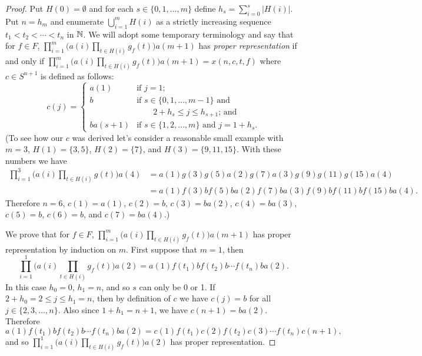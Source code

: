 \begin{proof}
  Put $H(0) = \emptyset$ and for each $s \in \{0, 1, \ldots, m\}$ define $h_s = \sum_{i=0}^s |H(i)|$.
  Put $n = h_m$ and enumerate $\bigcup_{i=1}^m H(i)$ as a strictly increasing sequence $t_1 < t_2 < \cdots < t_n$ in $\mathbb{N}$. 
  We will adopt some temporary terminology and say that for $f \in F$, $\prod_{i=1}^m \bigl( a(i) \prod_{t \in H(i)} g_f(t) \bigr) a(m+1)$ has \emph{proper representation} if and only if $\prod_{i=1}^m \bigl( a(i) \prod_{t \in H(i)} g_f(t) \bigr) a(m+1) = x(n, c, t, f)$ where $c \in S^{n+1}$ is defined as follows:
  \[
    c(j) = 
    \begin{cases}
      a(1) & \mbox{if $j = 1$;} \\
      b & \mbox{if $s \in \{0, 1, \ldots, m-1\}$ and} \\
      &   \hspace{2em}\mbox{$2+h_s \le j \le h_{s+1}$; and} \\
      ba(s+1) & \mbox{if $s \in \{1, 2, \ldots, m\}$ and $j = 1+h_s$.}
    \end{cases}
  \]
  {
    (To see how our $c$ was derived let's consider a reasonable small example with $m = 3$, $H(1) = \{3, 5\}$, $H(2) = \{7\}$, and $H(3) = \{9, 11, 15\}$.
    With these numbers we have
    \begin{align*}
      \textstyle
      \prod_{i=1}^3 \bigl( a(i) \prod_{t \in H(i)} g(t) \bigr) a(4) &=
      a(1) g(3)g(5) a(2) g(7) a(3) g(9)g(11)g(15) a(4) \\
      &= a(1) f(3)bf(5)b a(2) f(7)b a(3) f(9)bf(11)bf(15)b a(4).
    \end{align*}
    Therefore $n = 6$, $c(1) = a(1)$, $c(2) = b$, $c(3) = ba(2)$, $c(4) = ba(3)$, $c(5) = b$,  $c(6) = b$, and $c(7) = ba(4)$.)
  }

  We prove that for $f \in F$, $\prod_{i=1}^m \bigl( a(i) \prod_{t \in H(i)} g_f(t) \bigr) a(m+1)$ has proper representation by induction on $m$. 
  First suppose that $m = 1$, then 
  \[
    \textstyle
    \prod_{i=1}^1 \bigl( a(i) \prod_{t \in H(i)} g_f(t) \bigr) a(2) = a(1) f(t_1)b  f(t_2)b \cdots f(t_n)b a(2).
  \]
  In this case $h_0 = 0$, $h_1 = n$, and so $s$ can only be 0 or 1.
  If $2+h_0 = 2 \le j \le h_1 = n$, then by definition of $c$ we have $c(j) = b$ for all $j \in \{2, 3, \ldots, n\}$. 
  Also since $1 + h_1 = n+1$, we have $c(n+1) = ba(2)$. 
  Therefore
  \[
    \textstyle
    a(1) f(t_1)b  f(t_2)b \cdots f(t_n)b a(2) = c(1) f(t_1) c(2) f(t_2) c(3) \cdots f(t_n) c(n+1),
  \]
  and so $\prod_{i=1}^1 \bigl( a(i) \prod_{t \in H(i)} g_f(t) \bigr) a(2)$ has proper representation. 


\end{proof}

